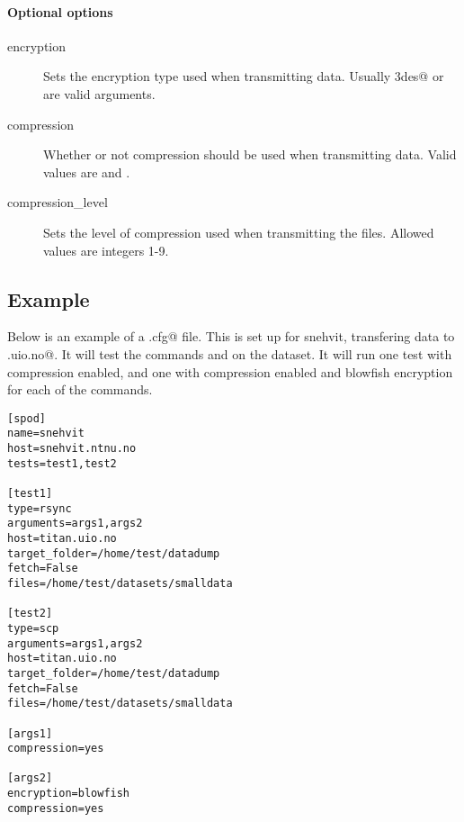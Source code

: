 \paragraph*{Optional options}

\begin{description}
    \item[encryption]   Sets the encryption type used when transmitting data.
        Usually \verb@3des@ or \verb@blowfish@ are valid arguments.
    \item[compression]  Whether or not compression should be used when
        transmitting data. Valid values are \verb@yes@ and \verb@no@.
    \item[compression\_level]   Sets the level of compression used when
        transmitting the files. Allowed values are integers 1-9.
\end{description}

\newpage
\subsection{Example}

Below is an example of a \verb@spodconf.cfg@ file. This is set up for snehvit,
transfering data to \verb@titan.uio.no@. It will test the commands \verb@rsync@
and \verb@scp@ on the \verb@smalldata@ dataset. It will run one test with
compression enabled, and one with compression enabled and blowfish encryption
for each of the commands. 

\begin{verbatim}
[spod]
name=snehvit
host=snehvit.ntnu.no
tests=test1,test2

[test1]
type=rsync
arguments=args1,args2
host=titan.uio.no
target_folder=/home/test/datadump
fetch=False
files=/home/test/datasets/smalldata

[test2]
type=scp
arguments=args1,args2
host=titan.uio.no
target_folder=/home/test/datadump
fetch=False
files=/home/test/datasets/smalldata

[args1]
compression=yes

[args2]
encryption=blowfish
compression=yes

\end{verbatim}
